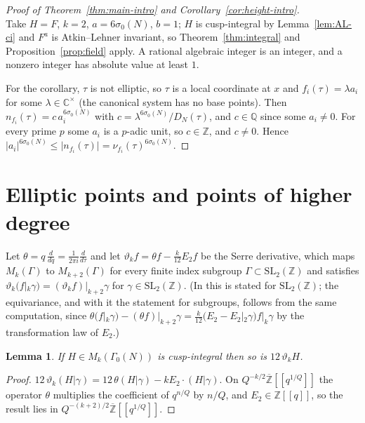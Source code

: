 \documentclass[11pt]{amsart}
\newtheorem{lemma}[theorem]{Lemma}
\theoremstyle{definition}
\theoremstyle{remark}
\newcommand{\Z}{\mathbb{Z}}
\newcommand{\Q}{\mathbb{Q}}
\newcommand{\C}{\mathbb{C}}
\newcommand{\Zbar}{\overline{\Z}}
\newcommand{\SL}{\mathrm{SL}}
\newcommand{\sz}{\sigma_0}
\begin{document}
\begin{proof}[Proof of Theorem~\textup{\ref{thm:main-intro}} and Corollary~\textup{\ref{cor:height-intro}}]
\leavevmode\\
Take $H=F$, $k=2$, $a=6\sz(N)$, $b=1$; $H$ is cusp-integral by
Lemma~\ref{lem:AL-ci} and $F^a$ is Atkin--Lehner invariant, so
Theorem~\ref{thm:integral} and Proposition~\ref{prop:field} apply.  A rational
algebraic integer is an integer, and a nonzero integer has absolute value at
least $1$.

For the corollary, $\tau$ is not elliptic, so $\tau$ is a local coordinate at $x$
and $f_i(\tau)=\lambda a_i$ for some $\lambda\in\C^\times$ (the canonical system
has no base points).  Then $n_{f_i}(\tau)=c\,a_i^{6\sz(N)}$ with
$c=\lambda^{6\sz(N)}/D_N(\tau)$, and $c\in\Q$ since some $a_i\ne0$.  For every
prime $p$ some $a_i$ is a $p$-adic unit, so $c\in\Z$, and $c\ne0$.  Hence
$\lvert a_i\rvert^{6\sz(N)}\le\lvert n_{f_i}(\tau)\rvert=\nu_{f_i}(\tau)^{6\sz(N)}$.
\end{proof}

\section{Elliptic points and points of higher degree}\label{sec:cons}

Let $\theta=q\,\frac{d}{dq}=\frac1{2\pi i}\frac{d}{d\tau}$ and let
$\vartheta_kf=\theta f-\frac k{12}E_2f$ be the Serre derivative, which maps
$M_k(\Gamma)$ to $M_{k+2}(\Gamma)$ for every finite index subgroup
$\Gamma\subset\SL_2(\Z)$ and satisfies
$\vartheta_k(f|_k\gamma)=(\vartheta_kf)|_{k+2}\gamma$ for $\gamma\in\SL_2(\Z)$.
(In \cite[\S5.1]{Zagier} this is stated for $\SL_2(\Z)$; the equivariance, and
with it the statement for subgroups, follows from the same computation, since
$\theta(f|_k\gamma)-(\theta f)|_{k+2}\gamma=\frac{k}{12}\bigl(E_2-E_2|_2\gamma\bigr)f|_k\gamma$
by the transformation law of $E_2$.)

\begin{lemma}\label{lem:serre}
If $H\in M_k(\Gamma_0(N))$ is cusp-integral then so is $12\,\vartheta_kH$.
\end{lemma}
\begin{proof}
$12\,\vartheta_k(H|\gamma)=12\,\theta(H|\gamma)-kE_2\cdot(H|\gamma)$.  On
$Q^{-k/2}\Zbar[[q^{1/Q}]]$ the operator $\theta$ multiplies the coefficient of
$q^{n/Q}$ by $n/Q$, and $E_2\in\Z[[q]]$, so the result lies in
$Q^{-(k+2)/2}\Zbar[[q^{1/Q}]]$.
\end{proof}
\end{document}
